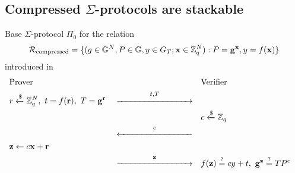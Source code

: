 \subsection{Compressed $\Sigma$-protocols are stackable}
\begin{protocol}[label={prot:compressed-sigs}]{Base $\Sigma$-protocol $\Pi_0$ for the relation 
$$\mathcal R_{\text{compressed}} = \{(g \in \mathbb{G}^N, P \in \mathbb{G}, y \in G_T; \mathbf{x} \in \mathbb{Z}_q^N): P = \mathbf{g^x}, y = f(\mathbf{x})\}$$ introduced in \cite{attema}} 
   \vspace{-0.5cm}
   \begin{align*}
       &\text{Prover}& 
       &&
       &\text{Verifier}& 
       \\
       &r \samplefrom \Z_q^N,\ t = f(\mathbf{r}),\ T = \mathbf{g^r}&
       &\overset  {t, T} {\xrightarrow{\hspace{3cm}}}&
       && 
       \\
       &&
       &&
       &c \samplefrom \Z_q&
       \\
       &&
       &\overset c {\xleftarrow{\hspace{3cm}}}&
       &&
       \\
       &\mathbf{z} \leftarrow c\mathbf{x} + \mathbf{r}&
       &&
       &&
       \\
       &&
       &\overset {\mathbf{z}} {\xrightarrow{\hspace{3cm}}}&
       &f(\mathbf{z}) \verify cy + t, \ \mathbf{g^z} \verify TP^c&
   \end{align*}
   \label{prot:base-compressed}
\end{protocol}